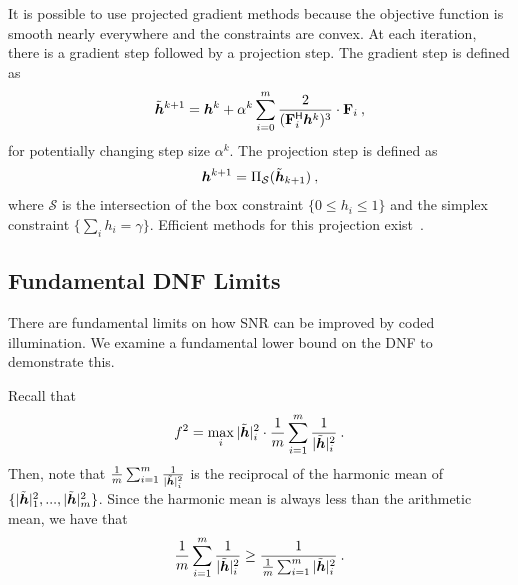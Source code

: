 It is possible to use projected gradient methods because the objective function is smooth nearly everywhere and the constraints are convex. At each iteration, there is a gradient step followed by a projection step.
The gradient step is defined as
\begin{align*}
    \tilde {\bm{h}}^{k+1} = \bm{h}^k + \alpha^k \sum_{i=0}^m   \frac{2}{(\mathbf{F}_i^{\mathsf{H}} \bm{h}^k)^{3}} \cdot \mathbf{F}_i\:,
\end{align*}
for potentially changing step size $\alpha^k$.
The projection step is defined as
\begin{align*}
    \bm{h}^{k+1} = \Pi_{\mathcal{S}}(\tilde {\bm{h}}_{k+1})\:,
\end{align*}
where $\mathcal{S}$ is the intersection of the box constraint $\{0\leq h_i\leq 1\}$ and the simplex constraint $\{\sum_i h_i = \gamma\}$. Efficient methods for this projection exist~\cite{gupta2010l1}.

\subsection{Fundamental DNF Limits}\label{sec:appendix:dnf_limit}

There are fundamental limits on how SNR can be improved by coded illumination.
We examine a fundamental lower bound on the DNF to demonstrate this.

Recall that
\[f^2 = \max_i |\tilde {\bm{h}}|_i^2\cdot \frac{1}{m} \sum_{i=1}^m \frac{1}{|\tilde {\bm{h}}|_i^2}\:.\]
Then, note that $\frac{1}{m} \sum_{i=1}^m \frac{1}{|\tilde {\bm{h}}|_i^2}$ is the reciprocal of the {harmonic mean} of $\{|\tilde {\bm{h}}|_1^2,...,|\tilde {\bm{h}}|_m^2\}$. Since the harmonic mean is always less than the {arithmetic mean}, we have that
$$ \frac{1}{m} \sum_{i=1}^m \frac{1}{|\tilde {\bm{h}}|_i^2}\geq \frac{1}{\frac{1}{m}\sum_{i=1}^m |\tilde {\bm{h}}|_i^2}\:. $$

